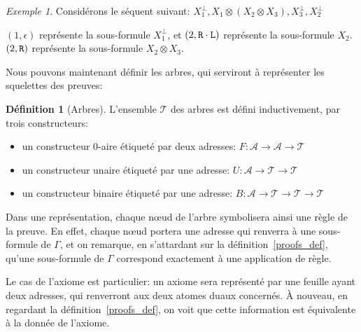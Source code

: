 \documentclass[11pt,a4paper]{article}
\theoremstyle{plain}
\theoremstyle{definition}
\newtheorem{definition}{Définition}
\theoremstyle{remark}
\newtheorem{example}{Exemple}
\newcommand*{\orth}{^\perp}
\newcommand*{\tensor}{\otimes}
\newcommand*{\sequent}{\Gamma}
\newcommand*{\Left}{\textnormal{\texttt{L}}}
\newcommand*{\Right}{\textnormal{\texttt{R}}}
\newcommand*{\trees}{\ensuremath{\mathcal{T}}}
\begin{document}
\begin{example}
Considérons le séquent suivant:
\quad $X_1\orth, X_1 \tensor (X_2 \tensor X_3), X_3\orth, X_2\orth$

$(1, \epsilon)$ représente la sous-formule $X_1\orth$, et $(2, \Right \cdot \Left)$ représente la sous-formule $X_2$. $(2, \Right)$ représente la sous-formule $X_2 \tensor X_3$.
\end{example}

Nous pouvons maintenant définir les arbres, qui serviront à représenter les squelettes des preuves:

\begin{definition}[Arbres]
\label{def_trees}
L'ensemble \trees{} des arbres est défini inductivement, par trois constructeurs:
\begin{itemize}
  \item un constructeur $0$-aire étiqueté par deux adresses: $F: \mathcal{A} \rightarrow \mathcal{A} \rightarrow \trees$
  \item un constructeur unaire étiqueté par une adresse: $U: \mathcal{A} \rightarrow \trees \rightarrow \trees$
  \item un constructeur binaire étiqueté par une adresse: $B: \mathcal{A} \rightarrow \trees \rightarrow \trees \rightarrow \trees$
\end{itemize}
\end{definition}

Dans une représentation, chaque n\oe ud de l'arbre symbolisera ainsi une règle de la preuve. En effet, chaque n\oe ud portera une adresse qui renverra à une sous-formule de $\sequent$, et on remarque, en s'attardant sur la définition~\ref{proofs_def}, qu'une sous-formule de $\sequent$ correspond exactement à une application de règle.

Le cas de l'axiome est particulier: un axiome sera représenté par une feuille ayant deux adresses, qui renverront aux deux atomes duaux concernés. À nouveau, en regardant la définition~\ref{proofs_def}, on voit que cette information est équivalente à la donnée de l'axiome.
\end{document}
